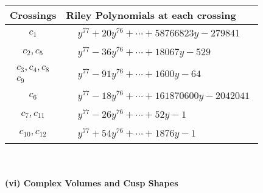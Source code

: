 \documentclass[1p]{elsarticle_modified}
\theoremstyle{definition}
\begin{document}
\begin{tabular}{m{50pt}|m{274pt}}
Crossings & \hspace{64pt}Riley Polynomials at each crossing \\
\hline $$\begin{aligned}c_{1}\end{aligned}$$&$\begin{aligned}
&y^{77}+20 y^{76}+\cdots+58766823 y-279841
\end{aligned}$\\
\hline $$\begin{aligned}c_{2},c_{5}\end{aligned}$$&$\begin{aligned}
&y^{77}-36 y^{76}+\cdots+18067 y-529
\end{aligned}$\\
\hline $$\begin{aligned}c_{3},c_{4},c_{8}\\c_{9}\end{aligned}$$&$\begin{aligned}
&y^{77}-91 y^{76}+\cdots+1600 y-64
\end{aligned}$\\
\hline $$\begin{aligned}c_{6}\end{aligned}$$&$\begin{aligned}
&y^{77}-18 y^{76}+\cdots+161870600 y-2042041
\end{aligned}$\\
\hline $$\begin{aligned}c_{7},c_{11}\end{aligned}$$&$\begin{aligned}
&y^{77}-26 y^{76}+\cdots+52 y-1
\end{aligned}$\\
\hline $$\begin{aligned}c_{10},c_{12}\end{aligned}$$&$\begin{aligned}
&y^{77}+54 y^{76}+\cdots+1876 y-1
\end{aligned}$\\
\hline
\end{tabular}\\~\\
\newpage\flushleft \textbf{(vi) Complex Volumes and Cusp Shapes}
\end{document}
